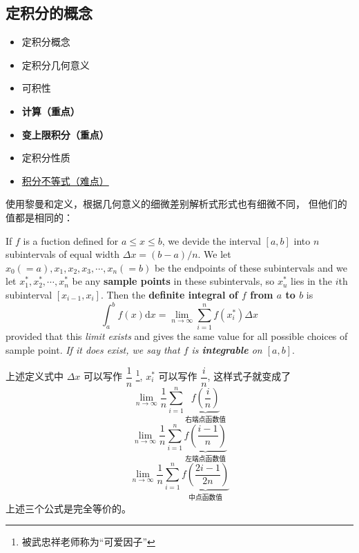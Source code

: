 \documentclass{beaulivre}
\begin{document}
\subsection{定积分的概念}

\begin{itemize}
    \item 定积分概念
    \item 定积分几何意义
    \item 可积性
    \item \textbf{计算（重点）}
    \item \textbf{变上限积分（重点）}
    \item 定积分性质
    \item \underline{积分不等式（难点）}
\end{itemize}

使用黎曼和定义，根据几何意义的细微差别解析式形式也有细微不同，
但他们的值都是相同的：
\begin{definition}\label{defination-definite-integral}
    If $f$ is a fuction defined for $a \leq x \leq b$, 
    we devide the interval $[a, b]$ into $n$ subintervals of equal width
    $\Delta x = (b - a) / n$.
    We let $x_0 (=a), x_1, x_2, x_3, \cdots, x_n (=b)$ be the endpoints
    of these subintervals and we let $x_1^*, x_2^*, \cdots, x_n^*$ 
    be any \textbf{sample points} in these subintervals, so $x_u^*$
    lies in the $i$th subinterval $[x_{i-1}, x_i]$.
    Then the \textbf{definite integral of $f$ from $a$ to $b$} is
    \[
        \int_{a}^{b} f(x) \mbox{d} x = 
        \lim_{n \to \infty} \sum_{i = 1}^{n} f\left(x_i^*\right) \Delta x
    \]
    provided that this \emph{limit exists} and gives the same value for all
    possible choices of sample point. 
    \emph{If it does exist, we say that $f$ is \textbf{integrable} on $[a, b]$}.
    \cite[page 384]{stewart}
\end{definition}
上述定义式中 $\Delta x$ 可以写作 $\dfrac{1}{n}$
\footnote{被武忠祥老师称为“可爱因子”}, 
$x^*_i$ 可以写作 $\dfrac{i}{n}$, 
这样式子就变成了
\begin{equation}\label{eq:the-other-definition-definite-integral}
    \lim_{n \to \infty} \dfrac{1}{n}
    \sum_{i = 1}^{n} \underbrace{f\left(\dfrac{i}{n}\right)}_{\mbox{右端点函数值}} 
\end{equation}
\begin{equation}
    \lim_{n \to \infty} \dfrac{1}{n}
    \sum_{i = 1}^{n} \underbrace{f\left(\dfrac{i-1}{n}\right)}_{\mbox{左端点函数值}}
\end{equation}
\begin{equation}
    \lim_{n \to \infty} \dfrac{1}{n}
    \sum_{i = 1}^{n} \underbrace{f\left(\dfrac{2i-1}{2n}\right)}_{\mbox{中点函数值}} 
\end{equation}
上述三个公式是完全等价的。
\end{document}

